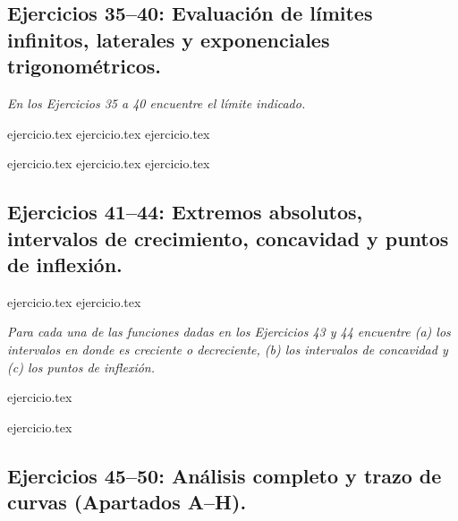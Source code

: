 \subsection*{Ejercicios 35--40: Evaluación de límites infinitos, laterales y exponenciales trigonométricos.}

\noindent \textit{En los Ejercicios 35 a 40 encuentre el límite indicado.}

\begin{enumerate}
    \setcounter{enumi}{34}
    \begin{minipage}{0.45\textwidth}
    {ejercicio.tex}
    {ejercicio.tex}
    {ejercicio.tex}
    \end{minipage}%
    \begin{minipage}{0.45\textwidth}
    {ejercicio.tex}
    {ejercicio.tex}
    {ejercicio.tex}
    \end{minipage}
\end{enumerate}

\subsection*{Ejercicios 41--44: Extremos absolutos, intervalos de crecimiento, concavidad y puntos de inflexión.}

\begin{enumerate}
    \setcounter{enumi}{40}
    {ejercicio.tex}
    {ejercicio.tex}
\end{enumerate}

\noindent \textit{Para cada una de las funciones dadas en los Ejercicios 43 y 44 encuentre (a) los intervalos en donde es creciente o decreciente, (b) los intervalos de concavidad y (c) los puntos de inflexión.}

\begin{enumerate}
    \setcounter{enumi}{42}
    \begin{minipage}{0.45\textwidth}
    {ejercicio.tex}
    \end{minipage}%
    \begin{minipage}{0.45\textwidth}
    {ejercicio.tex}
    \end{minipage}
\end{enumerate}

\subsection*{Ejercicios 45--50: Análisis completo y trazo de curvas (Apartados A--H).}

